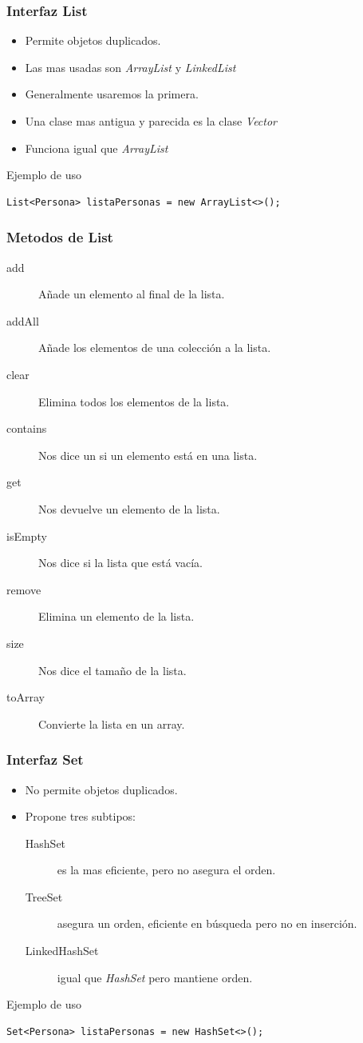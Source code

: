 \documentclass{beamer}
\begin{document}
\begin{frame}[fragile]
\frametitle{Interfaz List}
\begin{itemize}[<+->]
\item Permite objetos duplicados.
\item Las mas usadas son \emph{ArrayList} y \emph{LinkedList}
\item Generalmente usaremos la primera.
\item Una clase mas antigua y parecida es la clase \emph{Vector}
\item Funciona igual que \emph{ArrayList}
\end{itemize}
\pause
\begin{block}{Ejemplo de uso}
\begin{verbatim}
List<Persona> listaPersonas = new ArrayList<>();
\end{verbatim}
\end{block}
\end{frame}



\begin{frame}
\frametitle{Metodos de List}
\begin{description}
\item[add] Añade un elemento al final de la lista.
\item[addAll] Añade los elementos de una colección a la lista.
\item[clear] Elimina todos los elementos de la lista.
\item[contains] Nos dice un si un elemento está en una lista.
\item[get] Nos devuelve un elemento de la lista.
\item[isEmpty] Nos dice si la lista que está vacía.
\item[remove] Elimina un elemento de la lista.
\item[size] Nos dice el tamaño de la lista.
\item[toArray] Convierte la lista en un array.
\end{description}
\end{frame}

\begin{frame}[fragile]
\frametitle{Interfaz Set}
\begin{itemize}[<+->]
\item No permite objetos duplicados.
\item Propone tres subtipos:
\begin{description}
\item[HashSet] es la mas eficiente, pero no asegura el orden.
\item[TreeSet] asegura un orden, eficiente en búsqueda pero no en inserción.
\item[LinkedHashSet] igual que \emph{HashSet} pero mantiene orden.
\end{description}
\end{itemize}
\pause
\begin{block}{Ejemplo de uso}
\begin{verbatim}
Set<Persona> listaPersonas = new HashSet<>();
\end{verbatim}
\end{block}
\end{frame}
\end{document}
